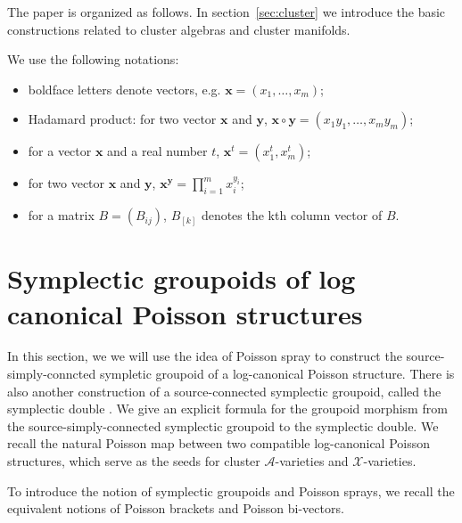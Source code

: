 \documentclass{amsart}
\newcommand{\bfx}{\mathbf{x}}
\newcommand{\bfy}{\mathbf{y}}
\newcommand{\cA}{\mathcal{A}}
\newcommand{\cX}{\mathcal{X}}
\begin{document}
The paper is organized as follows.
In section~\ref{sec:cluster} we introduce the basic constructions related to cluster algebras and cluster manifolds.

We use the following notations:
\begin{itemize}
	\item boldface letters denote vectors, e.g. $\bfx = (x_1, \ldots, x_m)$;
	\item Hadamard product: for two vector $\bfx$ and $\bfy$, $\bfx \circ \bfy = (x_1y_1, \ldots, x_my_m)$;
	\item for a vector $\bfx$ and a real number $t$, $\bfx^t = (x_1^t, x_m^t)$;
	\item for two vector $\bfx$ and $\bfy$, $\bfx^\bfy = \prod_{i=1}^m x_i^{y_i}$;
	\item for a matrix $B = (B_{ij})$, $B_{[k]}$ denotes the kth column vector of $B$.
\end{itemize}

\section{Symplectic groupoids of log canonical Poisson structures}

In this section, we we will use the idea of Poisson spray \cite{MR2900786} to construct the source-simply-conncted sympletic groupoid of a log-canonical Poisson structure. There is also another construction of a source-connected symplectic groupoid, called the symplectic double \cite{MR2470108}. We give an explicit formula for the groupoid morphism from the source-simply-connected symplectic groupoid to the symplectic double. We recall the natural Poisson map between two compatible log-canonical Poisson structures, which serve as the seeds for cluster $\cA$-varieties and $\cX$-varieties.


To introduce the notion of symplectic groupoids and Poisson sprays, we recall the equivalent notions of Poisson brackets and Poisson bi-vectors.
\end{document}
